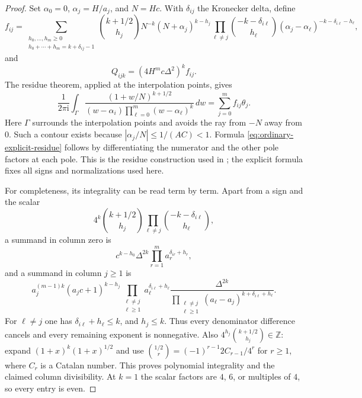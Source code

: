 \documentclass[12pt]{article}
\numberwithin{equation}{section}
\begin{document}
\begin{proof}
Set $\alpha_0=0$, $\alpha_j=H/a_j$, and $N=Hc$.  With $\delta_{ij}$
the Kronecker delta, define
\begin{equation}\label{eq:ordinary-explicit-residue}
 f_{ij}=
 \sum_{\substack{h_0,\ldots,h_m\ge0\\
                  h_0+\cdots+h_m=k+\delta_{ij}-1}}
 \binom{k+1/2}{h_j}N^{-k}(N+\alpha_j)^{k-h_j}
 \prod_{\ell\ne j}
 \binom{-k-\delta_{i\ell}}{h_\ell}
 (\alpha_j-\alpha_\ell)^{-k-\delta_{i\ell}-h_\ell},
\end{equation}
and
\[
 Q_{ijk}=(4H^mc\Delta^2)^k f_{ij}.
\]
The residue theorem, applied at the interpolation points, gives
\begin{equation}\label{eq:ordinary-contour}
 \frac1{2\pi\mathrm i}\int_\Gamma
 \frac{(1+w/N)^{k+1/2}}
 {(w-\alpha_i)\prod_{\ell=0}^m(w-\alpha_\ell)^k}\,dw
 =\sum_{j=0}^mf_{ij}\theta_j.
\end{equation}
Here $\Gamma$ surrounds the interpolation points and avoids the ray from
$-N$ away from $0$.  Such a contour exists because
$|\alpha_j/N|\le1/(AC)<1$.  Formula
\eqref{eq:ordinary-explicit-residue} follows by differentiating the
numerator and the other pole factors at each pole.  This is the residue
construction used in \cite[\S7]{JZ}; the explicit formula fixes all signs
and normalizations used here.

For completeness, its integrality can be read term by term.  Apart from
a sign and the scalar
\[
 4^k\binom{k+1/2}{h_j}
       \prod_{\ell\ne j}\binom{-k-\delta_{i\ell}}{h_\ell},
\]
a summand in column zero is
\[
 c^{k-h_0}\Delta^{2k}
       \prod_{r=1}^m a_r^{\delta_{ir}+h_r},
\]
and a summand in column $j\ge1$ is
\begin{equation}\label{eq:ordinary-polynomial-summand}
 a_j^{(m-1)k}(a_jc+1)^{k-h_j}
 \prod_{\substack{\ell\ne j\\\ell\ge1}}
       a_\ell^{\delta_{i\ell}+h_\ell}
 \frac{\Delta^{2k}}
 {\displaystyle\prod_{\substack{\ell\ne j\\\ell\ge1}}
 (a_\ell-a_j)^{k+\delta_{i\ell}+h_\ell}}.
\end{equation}
For $\ell\ne j$ one has $\delta_{i\ell}+h_\ell\le k$, and
$h_j\le k$.  Thus every denominator difference cancels and every
remaining exponent is nonnegative.  Also
$4^{h_j}\binom{k+1/2}{h_j}\in\mathbb Z$: expand
$(1+x)^k(1+x)^{1/2}$ and use
$\binom{1/2}{r}=(-1)^{r-1}2C_{r-1}/4^r$ for $r\ge1$, where
$C_r$ is a Catalan number.  This proves polynomial integrality and the
claimed column divisibility.  At $k=1$ the scalar factors are $4$, $6$,
or multiples of $4$, so every entry is even.


\end{proof}
\end{document}
